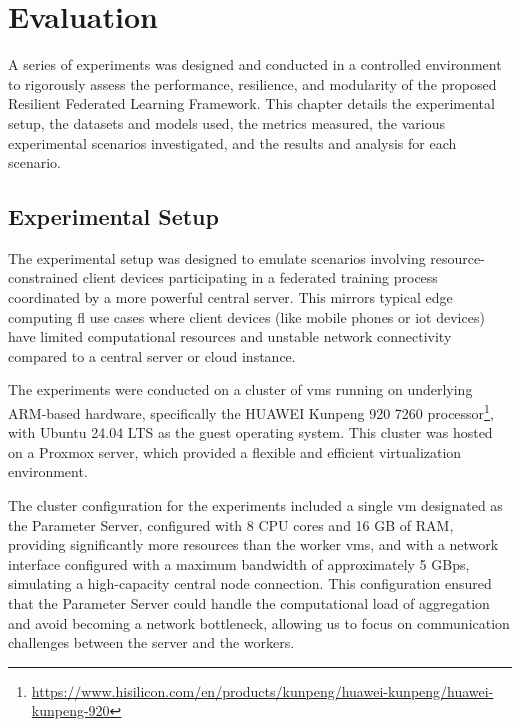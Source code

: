 \chapter{Evaluation}
\label{chap:evaluation}

\begin{introduction}

A series of experiments was designed and conducted in a controlled environment to rigorously assess the performance, resilience, and modularity of the proposed Resilient Federated Learning Framework. This chapter details the experimental setup, the datasets and models used, the metrics measured, the various experimental scenarios investigated, and the results and analysis for each scenario.

\end{introduction}

\section{Experimental Setup}
\label{sec:experimental-setup}

The experimental setup was designed to emulate scenarios involving resource-constrained client devices participating in a federated training process coordinated by a more powerful central server. This mirrors typical edge computing \ac{fl} use cases where client devices (like mobile phones or \ac{iot} devices) have limited computational resources and unstable network connectivity compared to a central server or cloud instance. 

The experiments were conducted on a cluster of \acp{vm} running on underlying ARM-based hardware, specifically the HUAWEI Kunpeng 920 7260 processor\footnote{\url{https://www.hisilicon.com/en/products/kunpeng/huawei-kunpeng/huawei-kunpeng-920}},  with Ubuntu 24.04 LTS as the guest operating system. This cluster was hosted on a Proxmox server, which provided a flexible and efficient virtualization environment. 

The cluster configuration for the experiments included a single \ac{vm} designated as the Parameter Server, configured with 8 CPU cores and 16 GB of RAM, providing significantly more resources than the worker \acp{vm}, and with a network interface configured with a maximum bandwidth of approximately 5 GBps, simulating a high-capacity central node connection. This configuration ensured that the Parameter Server could handle the computational load of aggregation and avoid becoming a network bottleneck, allowing us to focus on communication challenges between the server and the workers.

